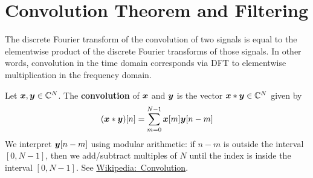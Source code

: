 \section{Convolution Theorem and Filtering}

\begin{bigidea}
The discrete Fourier transform of the convolution of two signals is equal to the elementwise product of the discrete Fourier transforms of those signals. In other words, convolution in the time domain corresponds via DFT to elementwise multiplication in the frequency domain.
\end{bigidea}

\begin{definition}
Let $\boldsymbol{x}, \boldsymbol{y} \in \mathbb{C}^N$. The {\bf convolution} of $\boldsymbol{x}$ and $\boldsymbol{y}$ is the vector $\boldsymbol{x} * \boldsymbol{y} \in \mathbb{C}^N$ given by
$$
( \boldsymbol{x} * \boldsymbol{y} )[n] = \sum_{m=0}^{N-1} \boldsymbol{x}[m] \boldsymbol{y}[n - m]
$$
We interpret $\boldsymbol{y}[n - m]$ using modular arithmetic: if $n - m$ is outside the interval $[0,N-1]$, then we add/subtract multiples of $N$ until the index is inside the interval $[0,N-1]$. See \href{https://en.wikipedia.org/wiki/Convolution}{Wikipedia:~Convolution}.
\end{definition}

